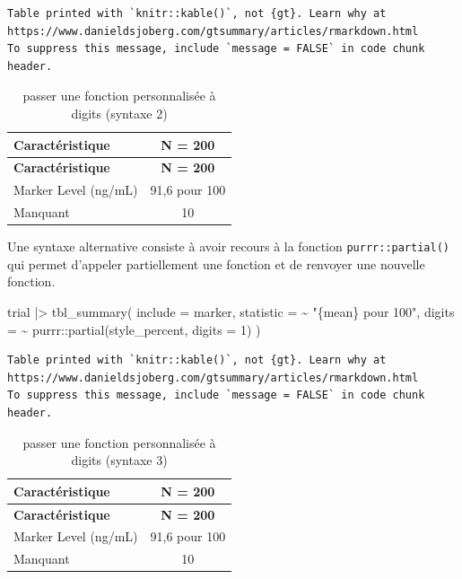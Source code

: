 \documentclass[
  letterpaper,
  DIV=11,
  numbers=noendperiod,
  oneside]{scrreprt}
\newenvironment{Shaded}{\begin{snugshade}}{\end{snugshade}}
\newcommand{\AttributeTok}[1]{\textcolor[rgb]{0.40,0.45,0.13}{#1}}
\newcommand{\DecValTok}[1]{\textcolor[rgb]{0.68,0.00,0.00}{#1}}
\newcommand{\FunctionTok}[1]{\textcolor[rgb]{0.28,0.35,0.67}{#1}}
\newcommand{\NormalTok}[1]{\textcolor[rgb]{0.00,0.23,0.31}{#1}}
\newcommand{\SpecialCharTok}[1]{\textcolor[rgb]{0.37,0.37,0.37}{#1}}
\newcommand{\StringTok}[1]{\textcolor[rgb]{0.13,0.47,0.30}{#1}}
\begin{document}
\begin{verbatim}
Table printed with `knitr::kable()`, not {gt}. Learn why at
https://www.danieldsjoberg.com/gtsummary/articles/rmarkdown.html
To suppress this message, include `message = FALSE` in code chunk header.
\end{verbatim}

\hypertarget{tbl-digits-4}{}
\begin{longtable}[]{@{}lc@{}}
\caption{\label{tbl-digits-4}passer une fonction personnalisée à digits
(syntaxe 2)}\tabularnewline
\toprule()
\textbf{Caractéristique} & \textbf{N = 200} \\
\midrule()
\endfirsthead
\toprule()
\textbf{Caractéristique} & \textbf{N = 200} \\
\midrule()
\endhead
Marker Level (ng/mL) & 91,6 pour 100 \\
Manquant & 10 \\
\bottomrule()
\end{longtable}

Une syntaxe alternative consiste à avoir recours à la fonction
\texttt{purrr::partial()} qui permet d'appeler partiellement une
fonction et de renvoyer une nouvelle fonction.

\begin{Shaded}
\begin{Highlighting}[]
\NormalTok{trial }\SpecialCharTok{|\textgreater{}}
  \FunctionTok{tbl\_summary}\NormalTok{(}
    \AttributeTok{include =}\NormalTok{ marker,}
    \AttributeTok{statistic =} \SpecialCharTok{\textasciitilde{}} \StringTok{"\{mean\} pour 100"}\NormalTok{,}
    \AttributeTok{digits =} \SpecialCharTok{\textasciitilde{}}\NormalTok{ purrr}\SpecialCharTok{::}\FunctionTok{partial}\NormalTok{(style\_percent, }\AttributeTok{digits =} \DecValTok{1}\NormalTok{)}
\NormalTok{  )}
\end{Highlighting}
\end{Shaded}

\begin{verbatim}
Table printed with `knitr::kable()`, not {gt}. Learn why at
https://www.danieldsjoberg.com/gtsummary/articles/rmarkdown.html
To suppress this message, include `message = FALSE` in code chunk header.
\end{verbatim}

\hypertarget{tbl-digits-5}{}
\begin{longtable}[]{@{}lc@{}}
\caption{\label{tbl-digits-5}passer une fonction personnalisée à digits
(syntaxe 3)}\tabularnewline
\toprule()
\textbf{Caractéristique} & \textbf{N = 200} \\
\midrule()
\endfirsthead
\toprule()
\textbf{Caractéristique} & \textbf{N = 200} \\
\midrule()
\endhead
Marker Level (ng/mL) & 91,6 pour 100 \\
Manquant & 10 \\
\bottomrule()
\end{longtable}
\end{document}
